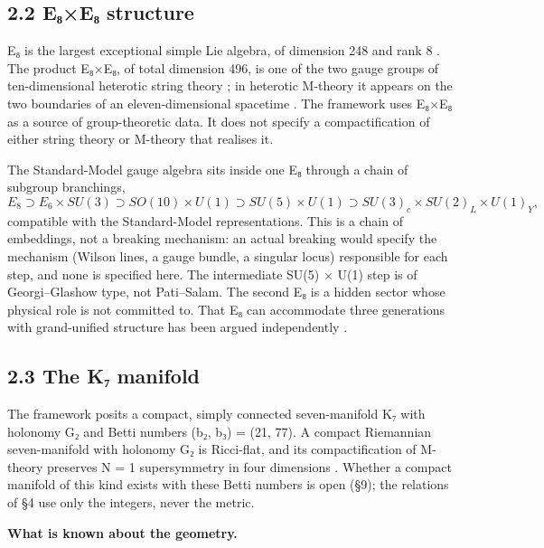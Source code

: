 \documentclass[11pt,a4paper]{article}
\begin{document}
\subsection{2.2 E₈×E₈ structure}\label{eux2088eux2088-structure}

E₈ is the largest exceptional simple Lie algebra, of dimension 248 and rank 8 \cite{18}. The product E₈×E₈, of total dimension 496, is one of the two gauge groups of ten-dimensional heterotic string theory \cite{19}; in heterotic M-theory it appears on the two boundaries of an eleven-dimensional spacetime \cite{32}. The framework uses E₈×E₈ as a source of group-theoretic data. It does not specify a compactification of either string theory or M-theory that realises it.

The Standard-Model gauge algebra sits inside one E₈ through a chain of subgroup branchings, \[E_8 \supset E_6 \times SU(3) \supset SO(10) \times U(1) \supset SU(5) \times U(1) \supset SU(3)_c \times SU(2)_L \times U(1)_Y,\] compatible with the Standard-Model representations. This is a chain of embeddings, not a breaking mechanism: an actual breaking would specify the mechanism (Wilson lines, a gauge bundle, a singular locus) responsible for each step, and none is specified here. The intermediate SU(5) × U(1) step is of Georgi--Glashow type, not Pati--Salam. The second E₈ is a hidden sector whose physical role is not committed to. That E₈ can accommodate three generations with grand-unified structure has been argued independently \cite{9}.

\subsection{2.3 The K₇ manifold}\label{the-kux2087-manifold}

The framework posits a compact, simply connected seven-manifold K₇ with holonomy G₂ and Betti numbers (b₂, b₃) = (21, 77). A compact Riemannian seven-manifold with holonomy G₂ is Ricci-flat, and its compactification of M-theory preserves N = 1 supersymmetry in four dimensions \cite{11}. Whether a compact manifold of this kind exists with these Betti numbers is open (§9); the relations of §4 use only the integers, never the metric.

\textbf{What is known about the geometry.}
\end{document}
